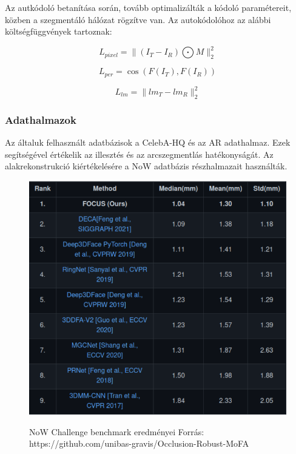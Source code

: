 \documentclass[12pt,a4]{article}
\begin{document}
         	      Az autkódoló betanítása során, tovább optimalizálták a kódoló paramétereit, 
                közben a szegmentáló hálózat rögzítve van. Az autokódolóhoz az alábbi költségfüggvények tartoznak:
        
                \begin{equation*}
                    L_{pixel} = \parallel (I_{T} − I_{R}) \bigodot M \parallel _{2}^{2} 
                \end{equation*}
                
                \begin{equation*}
                    L_{per} = \cos(F(I_{T}), F(I_{R}))    
                \end{equation*}
                
                \begin{equation*}
                    L_{lm} = \parallel lm_{T} - lm_{R} \parallel _{2}^{2}  
                \end{equation*}
            \subsubsection{Adathalmazok}
            
             	Az általuk felhasznált adatbázisok a CelebA-HQ és az AR adathalmaz.
             	Ezek segítségével értékelik az illesztés és az arcszegmentlás hatékonyságát.
             	Az alakrekonstrukció kiértékelésére a NoW adatbázis
             	részhalmazait használták.
     	
             	\begin{figure}[h!]	
             		\centering
             		\includegraphics[width=0.7\linewidth]{now}
             		\label{fig:now}
             		\caption{NoW Challenge benchmark eredményei
             			Forrás: https://github.com/unibas-gravis/Occlusion-Robust-MoFA}
             	\end{figure} 
\end{document}
